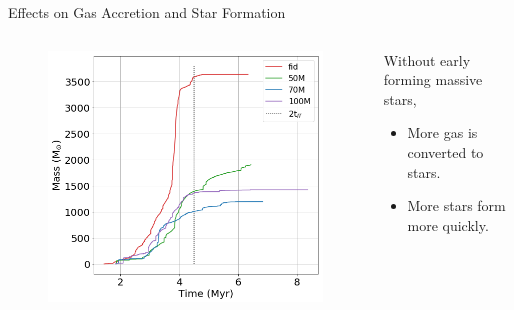 \documentclass[aspectratio=169]{beamer}
\begin{document}
\begin{frame}{Effects on Gas Accretion and Star Formation}{}
\begin{columns}
{\begin{column}{0.45\textwidth}
\begin{figure}[h!]
                \includegraphics[width=\linewidth]{../images/cumulative_stellar_mass_fixes.png} \\
                \label{fig:cum_mass}
            \end{figure}
        \end{column}
        \begin{column}{0.45\textwidth}
	    Without early forming massive stars,
	    \begin{itemize}
	        \item More gas is converted to stars.
	        \item More stars form more quickly.
	    \end{itemize}
        \end{column}
        }
    \end{columns}
\end{frame} 
\end{document}
